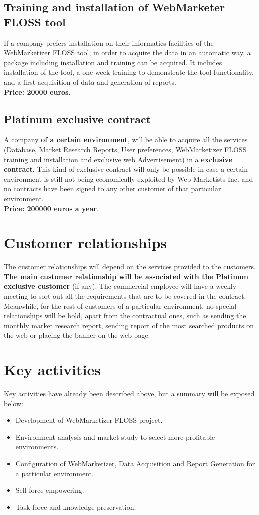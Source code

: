 \documentclass[11pt]{article}
\begin{document}
\subsection{Training and installation of WebMarketer FLOSS tool}
If a company prefers installation on their informatics facilities of the WebMarketizer FLOSS tool, in order to acquire the data in an automatic way, a package including installation and training can be acquired. It includes installation of the tool, a one week training to demonstrate the tool functionality, and a first acquisition of data and generation of reports.\\
\textbf{Price: 20000 euros}.
\subsection{Platinum exclusive contract}
A company \textbf{of a certain environment}, will be able to acquire all the services (Database, Market Research Reports, User preferences, WebMarketizer FLOSS training and installation and exclusive web Advertisement) in a \textbf{exclusive contract}. This kind of exclusive contract will only be possible in case a certain environment is still not being economically exploited by Web Marketists Inc. and no contracts have been signed to any other customer of that particular environment.\\
\textbf{Price: 200000 euros a year}.
\section{Customer relationships}
The customer relationships will depend on the services provided to the customers. 
\textbf{The main customer relationship will be associated with the Platinum exclusive customer} (if any). The commercial employee will have a weekly meeting to sort out all the requirements that are to be covered in the contract. Meanwhile, for the rest of customers of a particular environment, no special relationships will be hold, apart from the contractual ones, such as sending the monthly market research report, sending report of the most searched products on the web or placing the banner on the web page.
\section{Key activities}
Key activities have already been described above, but a summary will be exposed below:
\begin{itemize}
\item{Development of WebMarketizer FLOSS project.}
\item{Environment analysis and market study to select more profitable environments.}
\item{Configuration of WebMarketizer, Data Acquisition and Report Generation for a particular environment.}
\item{Sell force empowering.}
\item{Task force and knowledge preservation.}
\end{itemize}
\end{document}
